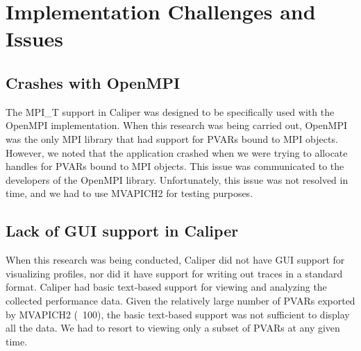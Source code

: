\section {Implementation Challenges and Issues}
\subsection{Crashes with OpenMPI}
The MPI\_T support in Caliper was designed to be specifically used with the OpenMPI implementation. When this research was being carried out, OpenMPI was the only MPI library that had support for PVARs bound to MPI objects. However, we noted that the application crashed when we were trying to allocate handles for PVARs bound to MPI objects. This issue was communicated to the developers of the OpenMPI library. Unfortunately, this issue was not resolved in time, and we had to use MVAPICH2 for testing purposes.

\subsection{Lack of GUI support in Caliper}
When this research was being conducted, Caliper did not have GUI support for visualizing profiles, nor did it have support for writing out traces in a standard format. Caliper had basic text-based support for viewing and analyzing the collected performance data. Given the relatively large number of PVARs exported by MVAPICH2 (~100), the basic text-based support was not sufficient to display all the data. We had to resort to viewing only a subset of PVARs at any given time.
